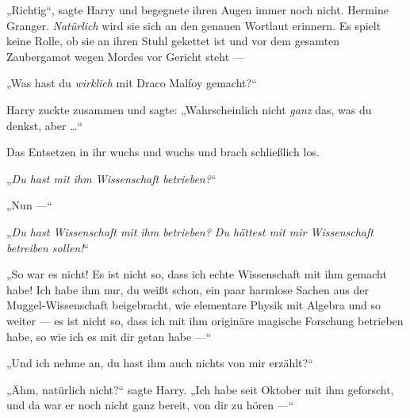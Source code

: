 „Richtig“, sagte Harry und begegnete ihren Augen immer noch nicht. Hermine Granger. \emph{Natürlich} wird sie sich an den genauen Wortlaut erinnern. Es spielt keine Rolle, ob sie an ihren Stuhl gekettet ist und vor dem gesamten Zaubergamot wegen Mordes vor Gericht steht —

„Was hast du \emph{wirklich} mit Draco Malfoy gemacht?“

Harry zuckte zusammen und sagte:
„Wahrscheinlich nicht \emph{ganz} das, was du denkst, aber …“

Das Entsetzen in ihr wuchs und wuchs und brach schließlich los.

„\emph{Du hast mit ihm \emph{Wissenschaft} betrieben?}“

„Nun —“

„\emph{Du hast \emph{Wissenschaft} mit ihm betrieben? Du hättest mit \emph{mir} Wissenschaft betreiben sollen!}“

„So war es nicht! Es ist nicht so, dass ich echte Wissenschaft mit ihm gemacht habe! Ich habe ihm nur, du weißt schon, ein paar harmlose Sachen aus der Muggel-Wissenschaft beigebracht, wie elementare Physik mit Algebra und so weiter — es ist nicht so, dass ich mit ihm originäre magische Forschung betrieben habe, so wie ich es mit dir getan habe —“

„Und ich nehme an, du hast ihm auch nichts von mir erzählt?“

„Ähm, natürlich nicht?“ sagte Harry.
„Ich habe seit Oktober mit ihm geforscht, und da war er noch nicht ganz bereit, von dir zu hören —“

